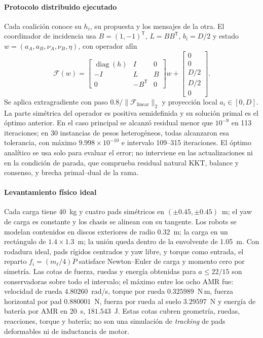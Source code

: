 \paragraph{Protocolo distribuido ejecutado}
Cada coalición conoce su $h_i$, su propuesta y los mensajes de la otra. El
coordinador de incidencia usa $B=(1,-1)^{\mathsf T}$, $L=BB^{\mathsf T}$,
$b_i=D/2$ y estado $w=(a_A,a_B,\nu_A,\nu_B,\eta)$, con operador afín
\[
 \mathcal F(w)=
 \begin{bmatrix}\operatorname{diag}(h) & I & 0\\ -I & L & B\\ 0 & -B^{\mathsf T} & 0\end{bmatrix}w
 +\begin{bmatrix}0\\0\\D/2\\D/2\\0\end{bmatrix}.
\]
Se aplica extragradiente con paso $0.8/\|\mathcal F_{\mathrm{linear}}\|_2$ y
proyección local $a_i\in[0,D]$. La parte simétrica del operador es positiva
semidefinida y su solución primal es el óptimo anterior. En el caso principal
se alcanzó residual menor que $10^{-9}$ en 113 iteraciones; en 30 instancias
de pesos heterogéneos, todas alcanzaron esa tolerancia, con máximo
$9.998\times10^{-10}$ e intervalo 109--315 iteraciones. El óptimo analítico
se usa solo para evaluar el error; no interviene en las actualizaciones ni en
la condición de parada, que comprueba residual natural KKT, balance y
consenso, y brecha primal--dual de la rama.

\paragraph{Levantamiento físico ideal}
Cada carga tiene 40~kg y cuatro pads simétricos en $(\pm0.45,\pm0.45)$~m; el
yaw de carga es constante y los chasis se alinean con su tangente. Los robots
se modelan contenidos en discos exteriores de radio 0.32~m; la carga en un
rectángulo de $1.4\times1.3$~m; la unión queda dentro de la envolvente de
1.05~m. Con rodadura ideal, pads rígidos centrados y yaw libre, y torque como
entrada, el reparto $f_i=(m_\ell/4)\ddot P$ satisface Newton--Euler de carga
y momento cero por simetría. Las cotas de fuerza, ruedas y energía obtenidas
para $a\leq22/15$ son conservadoras sobre todo el intervalo; el máximo entre
los ocho AMR fue: velocidad de rueda $4.80260$~rad/s, torque por rueda
$0.325989$~N\,m, fuerza horizontal por pad $0.880001$~N, fuerza por rueda al
suelo $3.29597$~N y energía de batería por AMR en 20~s, $181.543$~J. Estas
cotas cubren geometría, ruedas, reacciones, torque y batería; no son una
simulación de \emph{tracking} de pads deformables ni de inductancia de motor.

